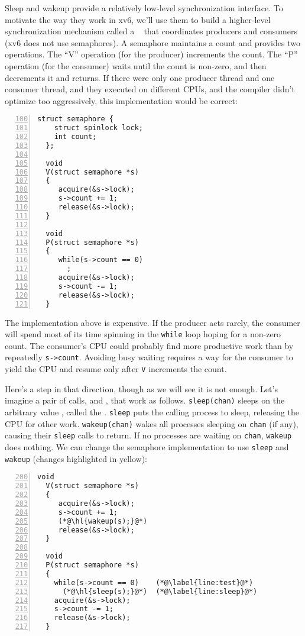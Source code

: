 Sleep and wakeup provide a relatively low-level synchronization
interface. To motivate the way they work in xv6,
we'll use them to build a higher-level
synchronization mechanism called a ~\cite{dijkstra65} that
coordinates producers and consumers
(xv6 does not use semaphores).
A semaphore maintains a count and provides two operations.
The ``V'' operation (for the producer) increments the count.
The ``P'' operation (for the consumer) waits until the count is non-zero,
and then decrements it and returns.
If there were only one producer thread and one consumer thread,
and they executed on different CPUs,
and the compiler didn't optimize too aggressively,
this implementation would be correct:
\begin{lstlisting}[numbers=left,firstnumber=100]
  struct semaphore {
    struct spinlock lock;
    int count;
  };

  void
  V(struct semaphore *s)
  {
     acquire(&s->lock);
     s->count += 1;
     release(&s->lock);
  }

  void
  P(struct semaphore *s)
  {
     while(s->count == 0)
       ;
     acquire(&s->lock);
     s->count -= 1;
     release(&s->lock);
  }
\end{lstlisting}

The implementation above 
is expensive.  If the producer acts
rarely, the consumer will spend most
of its time spinning in the 
\lstinline{while}
loop hoping for a non-zero count.
The consumer's CPU could probably find more productive work than 
by repeatedly 
\lstinline{s->count}.
Avoiding busy waiting requires
a way for the consumer to yield the CPU
and resume only after
\lstinline{V}
increments the count.

Here's a step in that direction, though as we
will see it is not enough.
Let's imagine a pair of calls, 
and
,
that work as follows.
\lstinline{sleep(chan)}
sleeps on the arbitrary value
,
called the 
.
\lstinline{sleep}
puts the calling process to sleep, releasing the CPU
for other work.
\lstinline{wakeup(chan)}
wakes all processes sleeping on
\lstinline{chan}
(if any), causing their
\lstinline{sleep}
calls to return.
If no processes are waiting on
\lstinline{chan},
\lstinline{wakeup}
does nothing.
We can change the semaphore implementation to use
\lstinline{sleep}
and
\lstinline{wakeup} (changes highlighted in yellow):
\begin{lstlisting}[numbers=left,firstnumber=200]
  void
  V(struct semaphore *s)
  {
     acquire(&s->lock);
     s->count += 1;
     (*@\hl{wakeup(s);}@*)
     release(&s->lock);
  }
  
  void
  P(struct semaphore *s)
  {
    while(s->count == 0)    (*@\label{line:test}@*)
      (*@\hl{sleep(s);}@*)  (*@\label{line:sleep}@*)
    acquire(&s->lock);
    s->count -= 1;
    release(&s->lock);
  }
\end{lstlisting}


